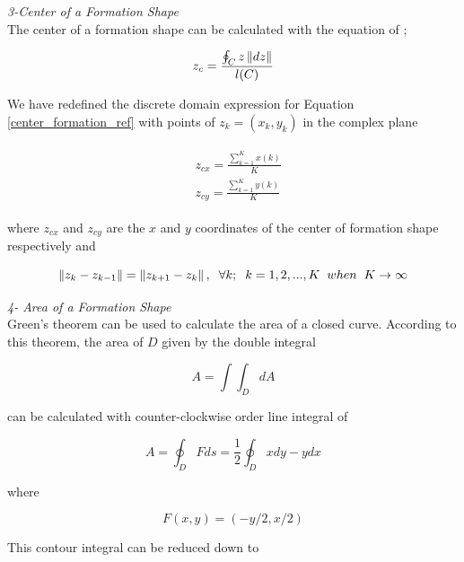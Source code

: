 \textit{ 	3-Center of a Formation Shape} \\ 	
The center of a formation shape can be calculated with the equation of \cite{17};

\begin{equation} \label{center_formation_ref}
 z_c = \frac{\oint_C z\left\lVert dz\right\rVert}{l(C)}
\end{equation}
		
We have redefined the discrete domain expression for Equation \ref{center_formation_ref} with points of  $z_k = (x_k,y_k)$ in the complex plane

\begin{align}
\begin{split}
&z_{cx} = \frac{\sum_{k=1}^{K}x(k)}{K}  \\
&z_{cy} = \frac{\sum_{k=1}^{K}y(k)}{K}  
\end{split}
\end{align}
		
where $z_{cx}$ and $z_{cy}$ are the $x$ and $y$ coordinates of the center of formation shape respectively and

\begin{equation}
\left\lVert z_k - z_{k-1}\right\rVert = \left\lVert z_{k+1} - z_k\right\rVert, \hspace{0.2cm}  \forall k ;  \hspace{0.2cm} k=1,2,...,K \hspace{0.2cm} when  \hspace{0.2cm} K \to\infty
\end{equation}

\textit{ 	4- Area of a Formation Shape} \\ 		
Green's theorem can be used to calculate the area of a closed curve. According to this theorem, the area of $D$ given by the double integral \cite{calculus}

\begin{equation}
 A = \int\int_D dA
\end{equation}
		
can be calculated with counter-clockwise order line integral of

\begin{equation}
 A = \oint_D F ds = \frac{1}{2} \oint_D xdy - ydx
\end{equation}

where

\begin{equation}
F(x,y) = (-y/2,x/2)
\end{equation}
		
This contour integral can be reduced down to

